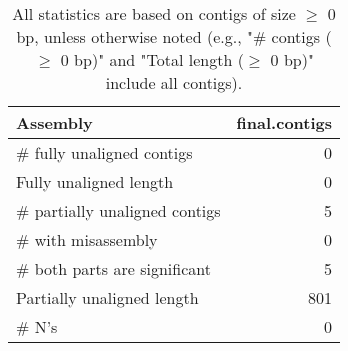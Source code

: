 \documentclass[12pt,a4paper]{article}
\begin{document}
\begin{table}[ht]
\begin{center}
\caption{All statistics are based on contigs of size $\geq$ 0 bp, unless otherwise noted (e.g., "\# contigs ($\geq$ 0 bp)" and "Total length ($\geq$ 0 bp)" include all contigs).}
\begin{tabular}{|l*{1}{|r}|}
\hline
Assembly & final.contigs \\ \hline
\# fully unaligned contigs & 0 \\ \hline
Fully unaligned length & 0 \\ \hline
\# partially unaligned contigs & 5 \\ \hline
\hspace{5mm}\# with misassembly & 0 \\ \hline
\hspace{5mm}\# both parts are significant & 5 \\ \hline
Partially unaligned length & 801 \\ \hline
\# N's & 0 \\ \hline
\end{tabular}
\end{center}
\end{table}
\end{document}
